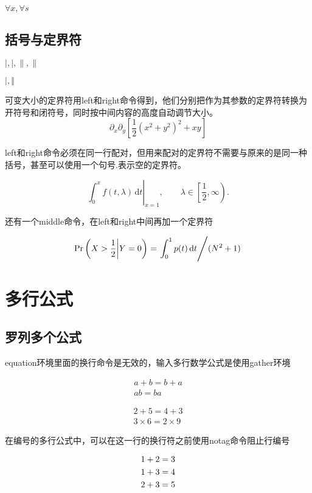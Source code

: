\documentclass[12pt]{article}
\begin{document}
$\forall x, \forall s$
	
	
\subsection{括号与定界符}

$\lvert, \rvert, \lVert, \rVert$
	
$\vert,\Vert$	

可变大小的定界符用left和right命令得到，他们分别把作为其参数的定界符转换为开符号和闭符号，同时按中间内容的高度自动调节大小。\\	
\[
\partial_x \partial_y \left[
\frac12 \left( x^2+y^2 \right)^2 +xy
\right]\]

left和right命令必须在同一行配对，但用来配对的定界符不需要与原来的是同一种括号，甚至可以使用一个句号.表示空的定界符。

\[
 \left.
 \int_0^x f(t, \lambda) \,\mathrm{d}t
 \right|_{x=1}, \qquad
 \lambda \in
 \left[\frac12,\infty\right).
 \]	

还有一个middle命令，在left和right中间再加一个定界符

\[
\Pr \left( X>\frac12
\middle\vert Y=0 \right)
= \left.
\int_0^1 p(t)\,\mathrm{d}t
\middle/ ( N^2+1) \right.
\]


\section{多行公式}

\subsection{罗列多个公式}
equation环境里面的换行命令是无效的，输入多行数学公式是使用gather环境

\begin{gather}
	a+b = b+a \\
	ab = ba
\end{gather}

\begin{gather*}
	2+5 = 4+3 \\
	3\times 6 = 2\times 9
\end{gather*}

在编号的多行公式中，可以在这一行的换行符之前使用notag命令阻止行编号


\begin{gather}
	1+2 = 3 \notag \\
	1+3 = 4 \notag \\
	2+3 = 5
\end{gather}
\end{document}
